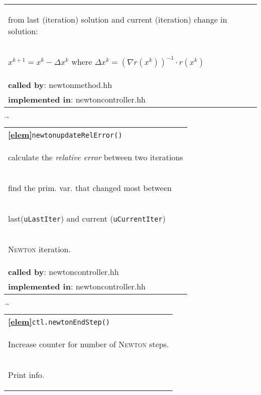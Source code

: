 \begin{landscape}
{\begin{tabular}{|l|}
      \begin{scriptsize}\quad from last (iteration) solution and current (iteration) change in  solution:\end{scriptsize}\\
      \begin{scriptsize} $x^{k+1} = x^k - \Delta x^k$ where $\Delta x^k = (\nabla r(x^k))^{-1} \cdot r(x^k)$\end{scriptsize}\\
      \textbf{called by}: newtonmethod.hh\\
      \textbf{implemented in}: newtoncontroller.hh\\
        \hline
  \end{tabular}
    {\scriptsize$\overrightarrow{}
    $}
   \begin{tabular}{|l|}
      \hline
      \textbf{\textcircled{\ref{elem}}}\verb+newtonupdateRelError()+\\
      \begin{scriptsize}calculate the \emph{relative error} between two iterations\end{scriptsize}\\
      \begin{scriptsize}\quad find the prim. var. that changed most between \end{scriptsize}\\
      \begin{scriptsize}\quad last(\verb+uLastIter+) and current (\verb+uCurrentIter+) \end{scriptsize}\\
      \begin{scriptsize}\quad \textsc{Newton} iteration.\end{scriptsize}\\
      \textbf{called by}: newtoncontroller.hh\\
      \textbf{implemented in}: newtoncontroller.hh\\
	\hline
  \end{tabular}
\nextline
    {\scriptsize$\overrightarrow{}
    $}
   \begin{tabular}{|l|}
      \hline
      \textbf{\textcircled{\ref{elem}}}\verb+ctl.newtonEndStep()+\\
      \begin{scriptsize}Increase counter for number of \textsc{Newton} steps. \end{scriptsize}\\
      \begin{scriptsize}Print info. \end{scriptsize}\\

\end{tabular}}
\end{landscape}
